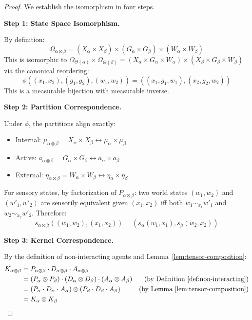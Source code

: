 \documentclass[11pt,a4paper]{article}
\theoremstyle{definition}
\theoremstyle{plain}
\theoremstyle{remark}
\begin{document}
\begin{proof}
We establish the isomorphism in four steps.

\textbf{Step 1: State Space Isomorphism.}

By definition:
\[
\Omega_{\alpha \otimes \beta} = (X_\alpha \times X_\beta) \times (G_\alpha \times G_\beta) \times (W_\alpha \times W_\beta)
\]
This is isomorphic to $\Omega_{\Theta(\alpha)} \times \Omega_{\Theta(\beta)} = (X_\alpha \times G_\alpha \times W_\alpha) \times (X_\beta \times G_\beta \times W_\beta)$ via the canonical reordering:
\[
\phi((x_1, x_2), (g_1, g_2), (w_1, w_2)) = ((x_1, g_1, w_1), (x_2, g_2, w_2))
\]
This is a measurable bijection with measurable inverse.

\textbf{Step 2: Partition Correspondence.}

Under $\phi$, the partitions align exactly:
\begin{itemize}
    \item Internal: $\mu_{\alpha \otimes \beta} = X_\alpha \times X_\beta \leftrightarrow \mu_\alpha \times \mu_\beta$
    \item Active: $a_{\alpha \otimes \beta} = G_\alpha \times G_\beta \leftrightarrow a_\alpha \times a_\beta$
    \item External: $\eta_{\alpha \otimes \beta} = W_\alpha \times W_\beta \leftrightarrow \eta_\alpha \times \eta_\beta$
\end{itemize}

For sensory states, by factorization of $P_{\alpha \otimes \beta}$: two world states $(w_1, w_2)$ and $(w'_1, w'_2)$ are sensorily equivalent given $(x_1, x_2)$ iff both $w_1 \sim_{x_1} w'_1$ and $w_2 \sim_{x_2} w'_2$. Therefore:
\[
s_{\alpha \otimes \beta}((w_1, w_2), (x_1, x_2)) = (s_\alpha(w_1, x_1), s_\beta(w_2, x_2))
\]

\textbf{Step 3: Kernel Correspondence.}

By the definition of non-interacting agents and Lemma~\ref{lem:tensor-composition}:
\begin{align*}
K_{\alpha \otimes \beta} &= P_{\alpha \otimes \beta} \cdot D_{\alpha \otimes \beta} \cdot A_{\alpha \otimes \beta} \\
&= (P_\alpha \otimes P_\beta) \cdot (D_\alpha \otimes D_\beta) \cdot (A_\alpha \otimes A_\beta) & \text{(by Definition~\ref{def:non-interacting})} \\
&= (P_\alpha \cdot D_\alpha \cdot A_\alpha) \otimes (P_\beta \cdot D_\beta \cdot A_\beta) & \text{(by Lemma~\ref{lem:tensor-composition})} \\
&= K_\alpha \otimes K_\beta
\end{align*}


\end{proof}
\end{document}
